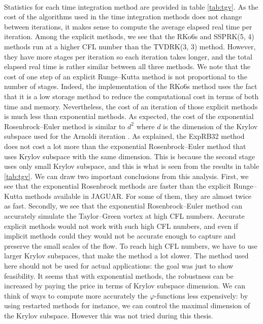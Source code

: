       \paragraph{}
      Statistics for each time integration method are provided in table \ref{tab:tgv}.
      As the cost of the algorithms used in the time integration methods does not change between iterations, it makes sense to compute the average elapsed real time per iteration.
      Among the explicit methods, we see that the RKo6s and SSPRK(5, 4) methods run at a higher CFL number than the TVDRK(3, 3) method.
      However, they have more stages per iteration so each iteration takes longer, and the total elapsed real time is rather similar between all three methods.
      We note that the cost of one step of an explicit Runge--Kutta method is not proportional to the number of stages.
      Indeed, the implementation of the RKo6s method uses the fact that it is a low storage method to reduce the computational cost in terms of both time and memory.
      Nevertheless, the cost of an iteration of those explicit methods is much less than exponential methods.
      As expected, the cost of the exponential Rosenbrock--Euler method is similar to $d^2$ where $d$ is the dimension of the Krylov subspace used for the Arnoldi iteration .
      As explained, the ExpRB32 method does not cost a lot more than the exponential Rosenbrock--Euler method that uses Krylov subspace with the same dimension.
      This is because the second stage uses only small Krylov subspace, and this is what is seen from the results in table \ref{tab:tgv}.
      We can draw two important conclusions from this analysis.
      First, we see that the exponential Rosenbrock methods are faster than the explicit Runge--Kutta methods available in JAGUAR.
      For some of them, they are almost twice as fast.
      Secondly, we see that the exponential Rosenbrock--Euler method can accurately simulate the Taylor--Green vortex at high CFL numbers.
      Accurate explicit methods would not work with such high CFL numbers, and even if implicit methods could they would not be accurate enough to capture and preserve the small scales of the flow.
      To reach high CFL numbers, we have to use larger Krylov subspaces, that make the method a lot slower.
      The method used here should not be used for actual applications: the goal was just to show feasibility.
      It seems that with exponential methods, the robustness can be increased by paying the price in terms of Krylov subspace dimension.
      We can think of ways to compute more accurately the $\varphi$-functions less expensively: by using restarted methods for instance, we can control the maximal dimension of the Krylov subspace.
      However this was not tried during this thesis.


